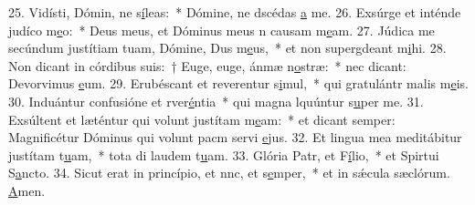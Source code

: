 25. Vidísti, Dómin, ne s\uline{í}leas:~* Dómine, ne dscédas \uline{a} me.
26. Exsúrge et inténde judíco m\uline{e}o:~* Deus meus, et Dóminus meus n causam m\uline{e}am.
27. Júdica me secúndum justítiam tuam, Dómine, Dus m\uline{e}us,~* et non supergdeant m\uline{i}hi.
28. Non dicant in córdibus suis:~† Euge, euge, ánmæ n\uline{o}stræ:~* nec dicant: Devorvimus \uline{e}um.
29. Erubéscant et reverentur s\uline{i}mul,~* qui gratulántr malis m\uline{e}is.
30. Induántur confusióne et rver\uline{é}ntia~* qui magna lquúntur s\uline{u}per me.
31. Exsúltent et læténtur qui volunt justítam m\uline{e}am:~* et dicant semper: Magnificétur Dóminus qui volunt pacm servi \uline{e}jus.
32. Et lingua mea meditábitur justítam t\uline{u}am,~* tota di laudem t\uline{u}am.
33. Glória Patr, et F\uline{í}lio,~* et Spirtui S\uline{a}ncto.
34. Sicut erat in princípio, et nnc, et s\uline{e}mper,~* et in sǽcula sæclórum. \uline{A}men.
